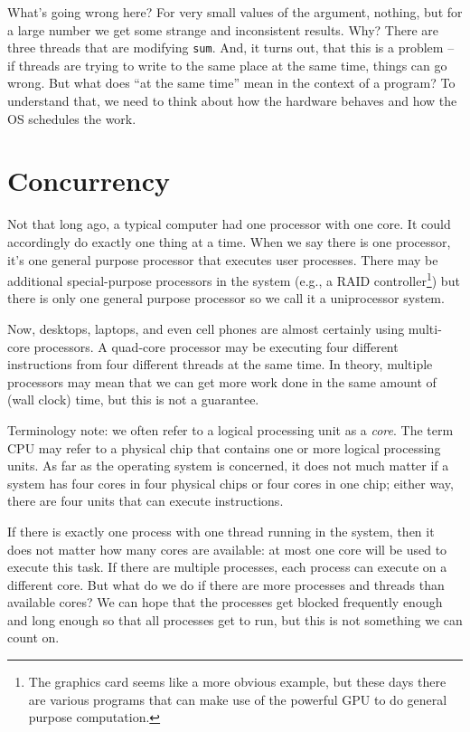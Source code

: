 What's going wrong here? For very small values of the argument, nothing, but for a large number we get some strange and inconsistent results. Why? There are three threads that are modifying \texttt{sum}. And, it turns out, that this is a problem -- if threads are trying to write to the same place at the same time, things can go wrong. But what does ``at the same time'' mean in the context of a program? To understand that, we need to think about how the hardware behaves and how the OS schedules the work.

\section*{Concurrency}

Not that long ago, a typical computer had one processor with one core. It could accordingly do exactly one thing at a time. When we say there is one processor, it's one general purpose processor that executes user processes. There may be additional special-purpose processors in the system (e.g., a RAID controller\footnote{The graphics card seems like a more obvious example, but these days there are various programs that can make use of the powerful GPU to do general purpose computation.}) but there is only one general purpose processor so we call it a uniprocessor system.

Now, desktops, laptops, and even cell phones are almost certainly using multi-core processors. A quad-core processor may be executing four different instructions from four different threads at the same time. In theory, multiple processors may mean that we can get more work done in the same amount of (wall clock) time, but this is not a guarantee. 

Terminology note: we often refer to a logical processing unit as a \textit{core}. The term CPU may refer to a physical chip that contains one or more logical processing units. As far as the operating system is concerned, it does not much matter if a system has four cores in four physical chips or four cores in one chip; either way, there are four units that can execute instructions.

If there is exactly one process with one thread running in the system, then it does not matter how many cores are available: at most one core will be used to execute this task. If there are multiple processes, each process can execute on a different core. But what do we do if there are more processes and threads than available cores? We can hope that the processes get blocked frequently enough and long enough so that all processes get to run, but this is not something we can count on.

